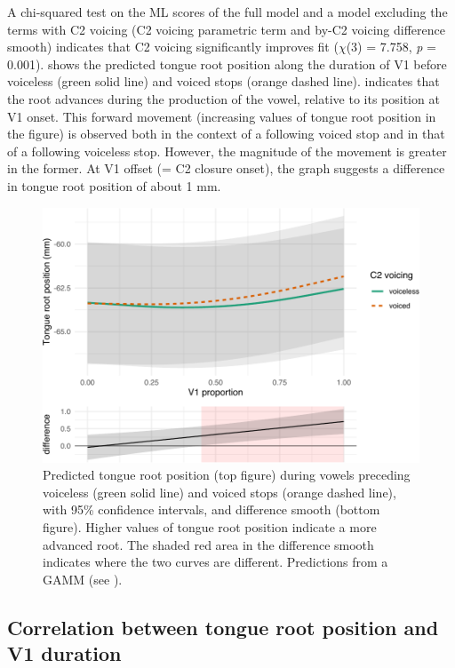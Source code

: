 \documentclass[preprint]{JASAnew}
\begin{document}
A chi-squared test on the ML scores of the full model and a model
excluding the terms with C2 voicing (C2 voicing parametric term and
by-C2 voicing difference smooth) indicates that C2 voicing significantly
improves fit (\(\chi\)(3) = 7.758, \emph{p} = 0.001). 
shows the predicted tongue root position along the duration of V1 before
voiceless (green solid line) and voiced stops (orange dashed line).
 indicates that the root advances during the production
of the vowel, relative to its position at V1 onset. This forward
movement (increasing values of tongue root position in the figure) is
observed both in the context of a following voiced stop and in that of a
following voiceless stop. However, the magnitude of the movement is
greater in the former. At V1 offset (= C2 closure onset), the graph
suggests a difference in tongue root position of about 1 mm.

\begin{figure}
\includegraphics[width=\linewidth]{./Figure4} \caption{Predicted tongue root position (top figure) during vowels preceding voiceless (green solid line) and voiced stops (orange dashed line), with 95\% confidence intervals, and difference smooth (bottom figure). Higher values of tongue root position indicate a more advanced root. The shaded red area in the difference smooth indicates where the two curves are different. Predictions from a GAMM (see ).}\label{f:Figure4}
\end{figure}

\hypertarget{correlation-between-tongue-root-position-and-v1-duration}{%
\subsection{Correlation between tongue root position and V1
duration}\label{correlation-between-tongue-root-position-and-v1-duration}}
\end{document}
